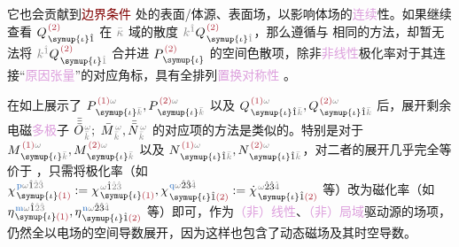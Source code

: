 它也会贡献到\textcolor{Maroon}{边界条件}  处的表面/体源、表面场，以影响体场的\textcolor{Plum}{连续}性。如果继续查看 $Q^{\;\! \textcolor{Maroon}{(2)}}_{\;\! \symup{\iota} \hat{1}}$ 在 $\mathcolor{gray}{\bar{\kappa}}$ 域的散度 $\mathcolor{gray}{k^{\hat{1}}} Q^{\;\! \textcolor{Maroon}{(2)}}_{\;\! \symup{\iota} \mathcolor{gray}{\hat{1}}}$，那么遵循与  相同的方法，却暂无法将 $\mathcolor{gray}{k^{\hat{1}}} Q^{\;\! \textcolor{Maroon}{(2)}}_{\;\! \symup{\iota} \mathcolor{gray}{\hat{1}}}$ 合并进 $P^{\;\! \textcolor{Maroon}{(2)}}_{\;\! \symup{\iota}}$ 的空间\textcolor{NavyBlue}{色散}项，除非\textcolor{Plum}{非线性}极化率对于其连接“\textcolor{Plum}{原因张量}”的对应角标，具有全排列\textcolor{Plum}{置换对称性} 。

在如上展示了 $P^{\;\! \textcolor{Maroon}{(1)} \mathcolor{gray}{\omega}}_{\;\! \symup{\iota}\mathcolor{gray}{\bar{k}}}, P^{\;\! \textcolor{Maroon}{(2)} \mathcolor{gray}{\omega}}_{\;\! \symup{\iota}\mathcolor{gray}{\bar{k}}}$ 以及 $Q^{\;\! \textcolor{Maroon}{(1)} \mathcolor{gray}{\omega}}_{\;\! \symup{\iota} \hat{1} \mathcolor{gray}{\bar{k}}}, Q^{\;\! \textcolor{Maroon}{(2)} \mathcolor{gray}{\omega}}_{\;\! \symup{\iota} \hat{1} \mathcolor{gray}{\bar{k}}}$ 后，展开剩余电磁\textcolor{Plum}{多极}子 $\bar{\bar{\bar{O}}}^{\;\!\mathcolor{gray}{\omega}}_{\;\!\mathcolor{gray}{\bar{k}}};$ $ \bar{M}^{\;\!\mathcolor{gray}{\omega}}_{\;\!\mathcolor{gray}{\bar{k}}},\bar{\bar{N}}^{\;\!\mathcolor{gray}{\omega}}_{\;\!\mathcolor{gray}{\bar{k}}}$ 的对应项的方法是类似的。特别是对于 $M^{\;\! \textcolor{Maroon}{(1)} \mathcolor{gray}{\omega}}_{\;\! \symup{\iota}\mathcolor{gray}{\bar{k}}}, M^{\;\! \textcolor{Maroon}{(2)} \mathcolor{gray}{\omega}}_{\;\! \symup{\iota}\mathcolor{gray}{\bar{k}}}$ 以及 $N^{\;\! \textcolor{Maroon}{(1)} \mathcolor{gray}{\omega}}_{\;\! \symup{\iota} \hat{1} \mathcolor{gray}{\bar{k}}}, N^{\;\! \textcolor{Maroon}{(2)} \mathcolor{gray}{\omega}}_{\;\! \symup{\iota} \hat{1} \mathcolor{gray}{\bar{k}}}$，对二者的展开几乎完全等价于 ，只需将极化率（如 $\chi^{\;\! \textcolor{NavyBlue}{\text{p}} \mathcolor{gray}{\omega} \hat{1} \mathcolor{gray}{\hat{2} \hat{3}}}_{\;\! \symup{\iota} \textcolor{Maroon}{(1)}} := \chi^{\;\! \mathcolor{gray}{\omega} \hat{1} \mathcolor{gray}{\hat{2} \hat{3}}}_{\;\! \symup{\iota} \textcolor{Maroon}{(1)}}, \chi^{\;\! \textcolor{NavyBlue}{\text{q}} \mathcolor{gray}{\omega} \hat{2} \hat{3} \mathcolor{gray}{\hat{4}}}_{\;\! \symup{\iota} \hat{1} \textcolor{Maroon}{(2)}} := \dot{\chi}^{\;\! \mathcolor{gray}{\omega} \hat{2} \hat{3} \mathcolor{gray}{\hat{4}}}_{\;\! \symup{\iota} \hat{1} \textcolor{Maroon}{(2)}}$ 等）改为磁化率（如 $\eta^{\;\! \textcolor{NavyBlue}{\text{m}} \mathcolor{gray}{\omega} \hat{1} \mathcolor{gray}{\hat{2} \hat{3}}}_{\;\! \symup{\iota} \textcolor{Maroon}{(1)}}, \eta^{\;\! \textcolor{NavyBlue}{\text{n}} \mathcolor{gray}{\omega} \hat{2} \hat{3} \mathcolor{gray}{\hat{4}}}_{\;\! \symup{\iota} \hat{1} \textcolor{Maroon}{(2)}}$ 等）即可，作为\textcolor{Plum}{（非）线性}、\textcolor{Plum}{（非）局域}\textcolor{NavyBlue}{驱动源}的场项，仍然全以电场的空间导数展开，因为这样也包含了动态磁场及其时空导数\cite{vandendriesscheInfluenceMagneticFields2014}。

